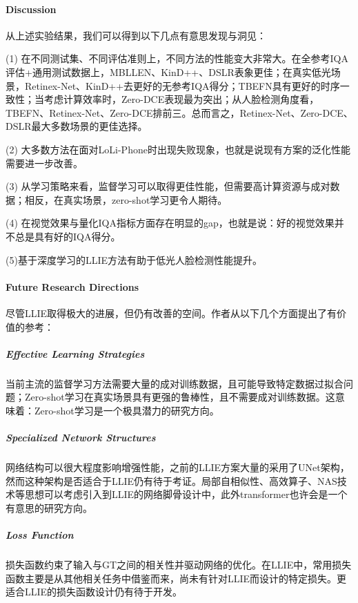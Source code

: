 \documentclass[letterpaper,12pt]{article}
\begin{document}
	\paragraph{Discussion} \qquad
	
	从上述实验结果，我们可以得到以下几点有意思发现与洞见：
	
	(1) 在不同测试集、不同评估准则上，不同方法的性能变大非常大。在全参考IQA评估+通用测试数据上，MBLLEN、KinD++、DSLR表象更佳；在真实低光场景，Retinex-Net、KinD++去更好的无参考IQA得分；TBEFN具有更好的时序一致性；当考虑计算效率时，Zero-DCE表现最为突出；从人脸检测角度看，TBEFN、Retinex-Net、Zero-DCE排前三。总而言之，Retinex-Net、Zero-DCE、DSLR最大多数场景的更佳选择。
	
	(2) 大多数方法在面对LoLi-Phone时出现失败现象，也就是说现有方案的泛化性能需要进一步改善。
	
	(3) 从学习策略来看，监督学习可以取得更佳性能，但需要高计算资源与成对数据；相反，在真实场景，zero-shot学习更令人期待。
	
	(4) 在视觉效果与量化IQA指标方面存在明显的gap，也就是说：好的视觉效果并不总是具有好的IQA得分。
	
	(5)基于深度学习的LLIE方法有助于低光人脸检测性能提升。
	
	
	
	
	\paragraph{Future Research Directions}
	
	尽管LLIE取得极大的进展，但仍有改善的空间。作者从以下几个方面提出了有价值的参考：	
		
		\subparagraph{Effective Learning Strategies}
		
		当前主流的监督学习方法需要大量的成对训练数据，且可能导致特定数据过拟合问题；Zero-shot学习在真实场景具有更强的鲁棒性，且不需要成对训练数据。这意味着：Zero-shot学习是一个极具潜力的研究方向。
			
		\subparagraph{Specialized Network Structures}
		
		网络结构可以很大程度影响增强性能，之前的LLIE方案大量的采用了UNet架构，然而这种架构是否适合于LLIE仍有待于考证。局部自相似性、高效算子、NAS技术等思想可以考虑引入到LLIE的网络脚骨设计中，此外transformer也许会是一个有意思的研究方向。
		
		\subparagraph{Loss Function}
		
		损失函数约束了输入与GT之间的相关性并驱动网络的优化。在LLIE中，常用损失函数主要是从其他相关任务中借鉴而来，尚未有针对LLIE而设计的特定损失。更适合LLIE的损失函数设计仍有待于开发。
		
\end{document}
